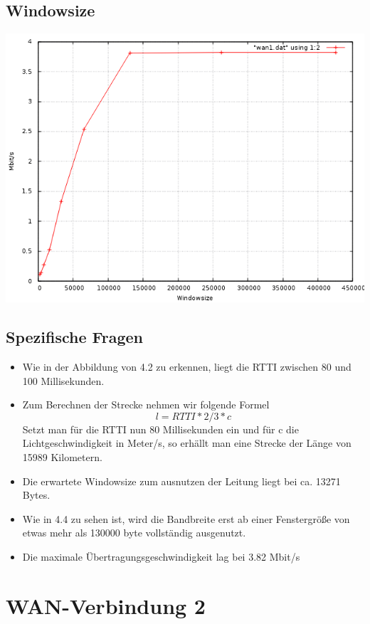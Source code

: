 \documentclass[a4paper,10pt]{article}
\begin{document}
\subsection{Windowsize}
\includegraphics[scale=0.75]{wan1_windows.png}

\subsection{Spezifische Fragen}
\begin{itemize}
 \item Wie in der Abbildung von 4.2 zu erkennen, liegt die RTTI zwischen 80 und 100 Millisekunden.
 \item {Zum Berechnen der Strecke nehmen wir folgende Formel
 \begin{equation}
  l=RTTI*2/3*c
 \end{equation}
 Setzt man für die RTTI nun 80 Millisekunden ein und für c die Lichtgeschwindigkeit in Meter/s,
 so erhällt man eine Strecke der Länge von 15989 Kilometern.}
 \item Die erwartete Windowsize zum ausnutzen der Leitung liegt bei ca. 13271 Bytes.
 \item Wie in 4.4 zu sehen ist, wird die Bandbreite erst ab einer Fenstergröße von etwas mehr als 130000 byte vollständig ausgenutzt.
 \item Die maximale Übertragungsgeschwindigkeit lag bei 3.82 Mbit/s
\end{itemize}

\section{WAN-Verbindung 2}
\end{document}

